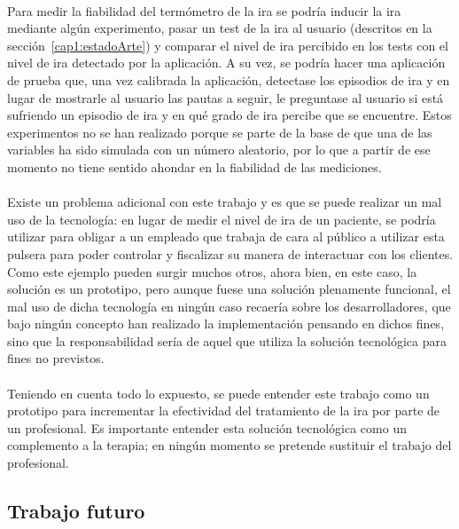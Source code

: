 \paragraph{}
Para medir la fiabilidad del termómetro de la ira se podría inducir la ira mediante algún experimento, pasar un test de la ira al usuario (descritos en la sección~\ref{cap1:estadoArte}) y comparar el nivel de ira percibido en los tests con el nivel de ira detectado por la aplicación. A su vez, se podría hacer una aplicación de prueba que, una vez calibrada la aplicación, detectase los episodios de ira y en lugar de mostrarle al usuario las pautas a seguir, le preguntase al usuario si está sufriendo un episodio de ira y en qué grado de ira percibe que se encuentre. Estos experimentos no se han realizado porque se parte de la base de que una de las variables ha sido simulada con un número aleatorio, por lo que a partir de ese momento no tiene sentido ahondar en la fiabilidad de las mediciones.

\paragraph{}
Existe un problema adicional con este trabajo y es que se puede realizar un mal uso de la tecnología: en lugar de medir el nivel de ira de un paciente, se podría utilizar para obligar a un empleado que trabaja de cara al público a utilizar esta pulsera para poder controlar y fiscalizar su manera de interactuar con los clientes. Como este ejemplo pueden surgir muchos otros, ahora bien, en este caso, la solución es un prototipo, pero aunque fuese una solución plenamente funcional, el mal uso de dicha tecnología en ningún caso recaería sobre los desarrolladores, que bajo ningún concepto han realizado la implementación pensando en dichos fines, sino que la responsabilidad sería de aquel que utiliza la solución tecnológica para fines no previstos.

\paragraph{}
Teniendo en cuenta todo lo expuesto, se puede entender este trabajo como un prototipo para incrementar la efectividad del tratamiento de la ira por parte de un profesional. Es importante entender esta solución tecnológica como un complemento a la terapia; en ningún momento se pretende sustituir el trabajo del profesional.

\subsection{Trabajo futuro}

